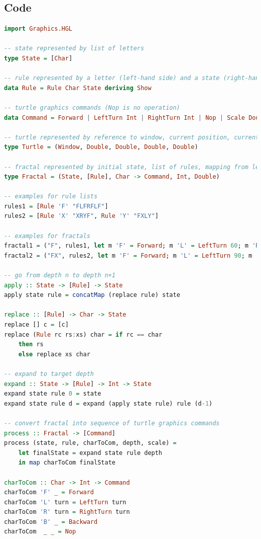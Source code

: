 \documentclass{article}
\begin{document}
\subsection{Code} \label{Code}
\begin{lstlisting}[language=Haskell]
import Graphics.HGL

-- state represented by list of letters
type State = [Char]

-- rule represented by a letter (left-hand side) and a state (right-hand side)
data Rule = Rule Char State deriving Show

-- turtle graphics commands (Nop is no operation)
data Command = Forward | LeftTurn Int | RightTurn Int | Nop | Scale Double | Backward deriving Show 

-- turtle represented by reference to window, current position, current angle, current length
type Turtle = (Window, Double, Double, Double, Double)

-- fractal represented by initial state, list of rules, mapping from letters to commands, target depth, initial length
type Fractal = (State, [Rule], Char -> Command, Int, Double)

-- examples for rule lists
rules1 = [Rule 'F' "FLFRFLF"]
rules2 = [Rule 'X' "XRYF", Rule 'Y' "FXLY"]

-- examples for fractals
fractal1 = ("F", rules1, let m 'F' = Forward; m 'L' = LeftTurn 60; m 'R' = RightTurn 120 in m)
fractal2 = ("FX", rules2, let m 'F' = Forward; m 'L' = LeftTurn 90; m 'R' = RightTurn 90; m _ = Nop in m)

-- go from depth n to depth n+1
apply :: State -> [Rule] -> State
apply state rule = concatMap (replace rule) state  

replace :: [Rule] -> Char -> State
replace [] c = [c]
replace (Rule rc rs:xs) char = if rc == char
    then rs
    else replace xs char
 
-- expand to target depth
expand :: State -> [Rule] -> Int -> State
expand state rule 0 = state
expand state rule d = expand (apply state rule) rule (d-1)

-- convert fractal into sequence of turtle graphics commands
process :: Fractal -> [Command]
process (state, rule, charToCom, depth, scale) =  
    let finalState = expand state rule depth
    in map charToCom finalState

charToCom :: Char -> Int -> Command
charToCom 'F' _ = Forward 
charToCom 'L' turn = LeftTurn turn
charToCom 'R' turn = RightTurn turn
charToCom 'B' _ = Backward
charToCom  _ _ = Nop


\end{lstlisting}
\end{document}
